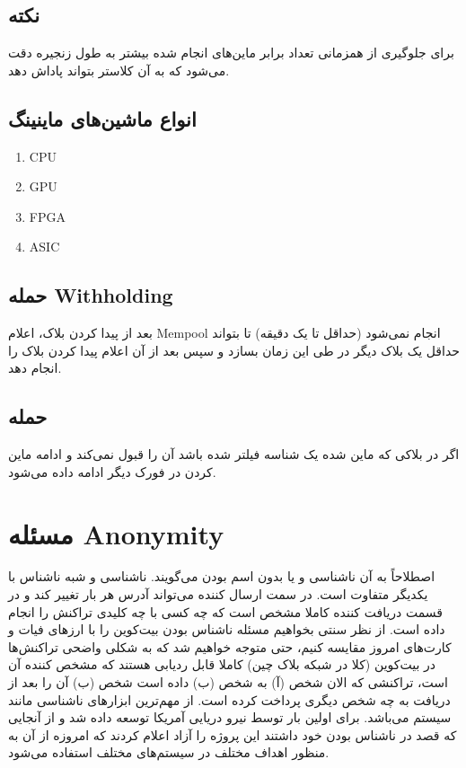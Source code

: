 \documentclass[10pt, a4paper]{article}
\begin{document}
\subsection*{نکته}

برای جلوگیری از همزمانی تعداد برابر ماین‌های انجام شده بیشتر به طول زنجیره دقت
می‌شود که به آن کلاستر بتواند پاداش دهد.

\subsection*{انواع ماشین‌های ماینینگ}

\begin{enumerate}
    \item CPU
    \item GPU
    \item FPGA
    \item ASIC
\end{enumerate}

\subsection{حمله Withholding}

بعد از پیدا کردن بلاک، اعلام Mempool انجام نمی‌شود (حداقل تا یک دقیقه) تا بتواند
حداقل یک بلاک دیگر در طی این زمان بسازد و سپس بعد از آن اعلام پیدا کردن بلاک را
انجام دهد.

\subsection{حمله }

اگر در بلاکی که ماین شده یک شناسه فیلتر شده باشد آن را قبول نمی‌کند و ادامه ماین
کردن در فورک دیگر ادامه داده می‌شود.

\section{مسئله Anonymity}

اصطلاحاً به آن ناشناسی و یا بدون اسم بودن می‌گویند. ناشناسی و شبه ناشناس با
یکدیگر متفاوت است. در سمت ارسال کننده می‌تواند آدرس  هر بار تغییر
کند و در قسمت دریافت کننده کاملا مشخص است که چه کسی با چه کلیدی تراکنش را انجام
داده است. از نظر سنتی بخواهیم مسئله ناشناس بودن بیت‌کوین را با ارز‌های فیات و
کارت‌های امروز مقایسه کنیم، حتی متوجه خواهیم شد که به شکلی واضحی تراکنش‌ها در
بیت‌کوین (کلا در شبکه بلاک چین) کاملا قابل ردیابی هستند که مشخص کننده آن است،
تراکنشی که الان شخص (آ) به شخص (ب) داده است شخص (ب) آن را بعد از دریافت به چه
شخص دیگری پرداخت کرده است. از مهم‌ترین ابزار‌های ناشناسی مانند سیستم 
می‌باشد.  برای اولین بار توسط نیرو دریایی آمریکا توسعه داده شد و از
آنجایی که قصد در ناشناس بودن خود داشتند این پروژه را آزاد اعلام کردند که امروزه
از آن به منظور اهداف مختلف در سیستم‌های مختلف استفاده می‌شود.
\end{document}
